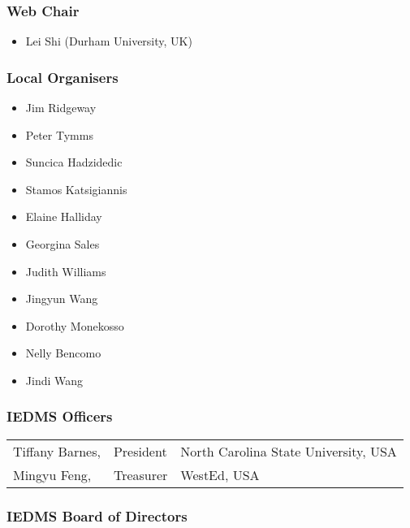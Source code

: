 \documentclass[letterpaper,11pt,oneside]{book} %
\providecommand{\tightlist}{%
  \setlength{\itemsep}{0pt}\setlength{\parskip}{0pt}}
\begin{document}
\subsubsection{Web Chair}%

\begin{itemize}
\tightlist
\item
  Lei Shi (Durham University, UK)
\end{itemize}

\subsubsection{Local Organisers}%

\begin{itemize}
\tightlist
\item
  Jim Ridgeway
\item
  Peter Tymms
\item
  Suncica Hadzidedic
\item
  Stamos Katsigiannis
\item
  Elaine Halliday
\item
  Georgina Sales
\item
  Judith Williams
\item
  Jingyun Wang
\item
  Dorothy Monekosso
\item
  Nelly Bencomo
\item
  Jindi Wang
\end{itemize}

\subsubsection{IEDMS Officers}%

\begin{longtable}[]{@{}lll@{}}
& & \\
\endhead
Tiffany Barnes, & President & North Carolina State University, USA \\
Mingyu Feng, & Treasurer & WestEd, USA \\
\end{longtable}

\subsubsection{IEDMS Board of
Directors}%
\end{document}
